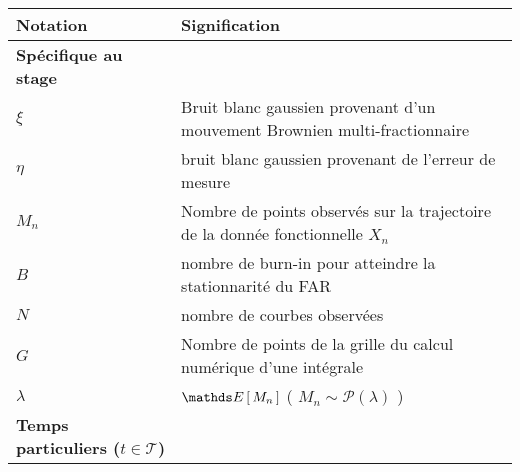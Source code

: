 \begin{table}[H]
\centering
	\begin{tabularx}{\textwidth}{lX}
		\toprule
		\textbf{Notation} & \textbf{Signification}                                                                                                                                                                          \\
		\midrule
		\textbf{Spécifique au stage}                                                                                                                                                                                        \\
		\midrule
		$\xi$             & Bruit blanc gaussien provenant d'un mouvement Brownien multi-fractionnaire                                                                                                                      \\
		$\eta$            & bruit blanc gaussien provenant de l'erreur de mesure                                                                                                                                            \\
		\midrule
		$M_n$             & Nombre de points observés sur la trajectoire de la donnée fonctionnelle $X_n$                                                                                                                   \\
		$B$               & nombre de burn-in pour atteindre la stationnarité du FAR                                                                                                                                        \\
		$N$               & nombre de courbes observées                                                                                                                                                                     \\
		$G$               & Nombre de points de la grille du calcul numérique d'une intégrale                                                                                                                               \\
		\midrule
		$\lambda$         & $\esperance{M_n}$ ( $M_n \sim \mathcal P(\lambda)$ )                                                                                                                                            \\
		\midrule
		\textbf{Temps particuliers ($t \in \mathcal T$)}                                                                                                                                                                    \\

\end{tabularx}
\end{table}
